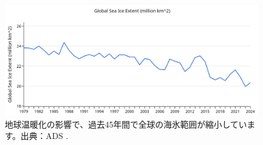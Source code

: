 \documentclass[10pt,twocolumn,letterpaper]{article}
\begin{document}
\begin{figure}[t]
\begin{center}
\includegraphics[width=1\textwidth]{ice.jpg}
\end{center}
   \caption{地球温暖化の影響で、過去45年間で全球の海氷範囲が縮小しています。出典：ADS \cite{149}.}
\label{fig:24}
\end{figure}

\clearpage
\twocolumn

{\small


}
\end{document}
